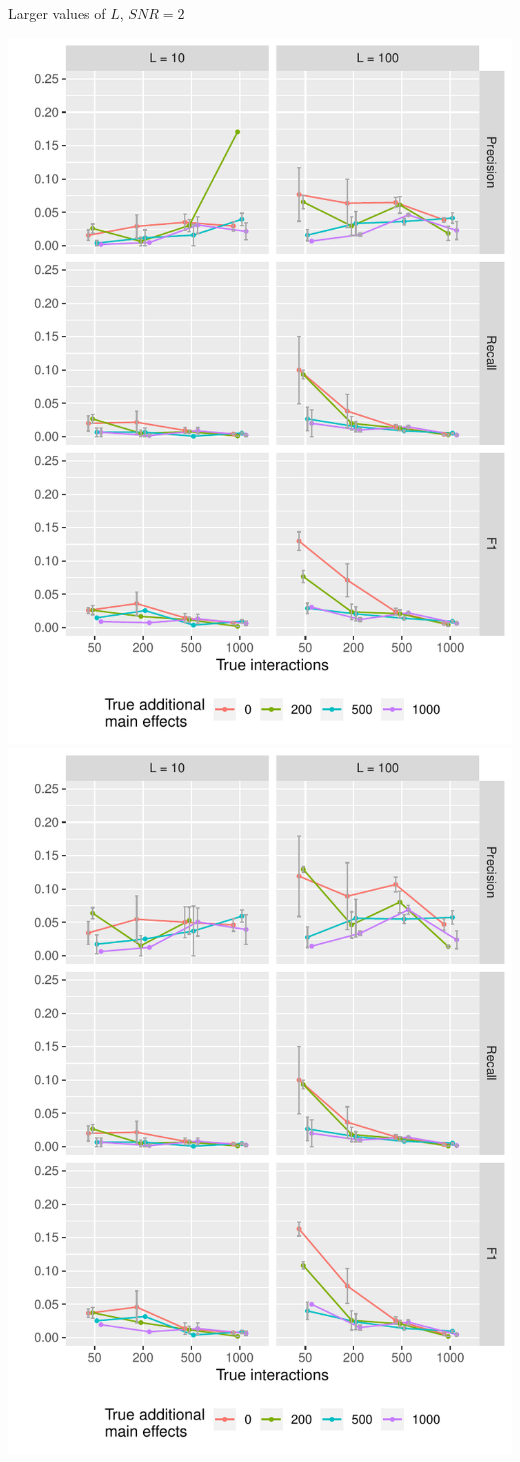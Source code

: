\documentclass[8pt]{beamer}
\begin{document}
\begin{frame}{Larger values of $L$, $SNR = 2$}
\begin{center}
	\begin{minipage}{0.9\linewidth}
		\centering
		\includegraphics[width=0.5\linewidth]{"l_diff/l_diff_n10000_SNR2_tno"}%
		\includegraphics[width=0.5\linewidth]{"l_diff/l_diff_n10000_SNR2_tyes"}
	\end{minipage}
\end{center}

\end{frame}
\end{document}
